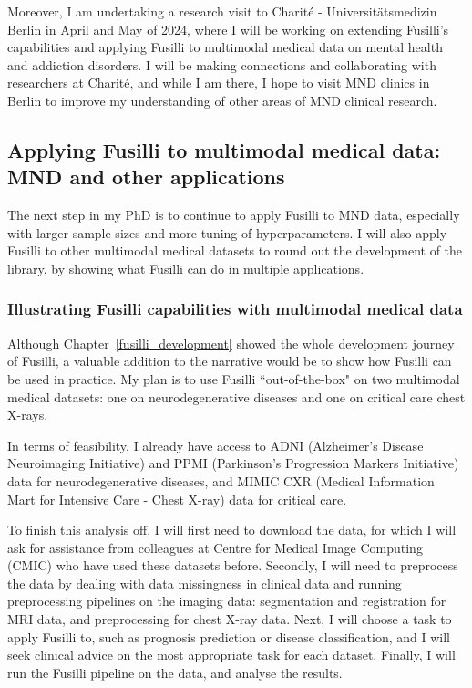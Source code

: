 Moreover, I am undertaking a research visit to Charité - Universitätsmedizin Berlin in April and May of 2024, where I will be working on extending Fusilli's capabilities and applying Fusilli to multimodal medical data on mental health and addiction disorders.
I will be making connections and collaborating with researchers at Charité, and while I am there, I hope to visit MND clinics in Berlin to improve my understanding of other areas of MND clinical research.

\subsection{Applying Fusilli to multimodal medical data: MND and other applications}

The next step in my PhD is to continue to apply Fusilli to MND data, especially with larger sample sizes and more tuning of hyperparameters.
I will also apply Fusilli to other multimodal medical datasets to round out the development of the library, by showing what Fusilli can do in multiple applications.

\subsubsection*{Illustrating Fusilli capabilities with multimodal medical data}

Although Chapter~\ref{fusilli_development} showed the whole development journey of Fusilli, a valuable addition to the narrative would be to show how Fusilli can be used in practice.
My plan is to use Fusilli ``out-of-the-box" on two multimodal medical datasets: one on neurodegenerative diseases and one on critical care chest X-rays.

In terms of feasibility, I already have access to ADNI (Alzheimer's Disease Neuroimaging Initiative) and PPMI (Parkinson's Progression Markers Initiative) data for neurodegenerative diseases, and MIMIC CXR (Medical Information Mart for Intensive Care - Chest X-ray) data for critical care.

To finish this analysis off, I will first need to download the data, for which I will ask for assistance from colleagues at Centre for Medical Image Computing (CMIC) who have used these datasets before.
Secondly, I will need to preprocess the data by dealing with data missingness in clinical data and running preprocessing pipelines on the imaging data: segmentation and registration for MRI data, and preprocessing for chest X-ray data.
Next, I will choose a task to apply Fusilli to, such as prognosis prediction or disease classification, and I will seek clinical advice on the most appropriate task for each dataset.
Finally, I will run the Fusilli pipeline on the data, and analyse the results.

